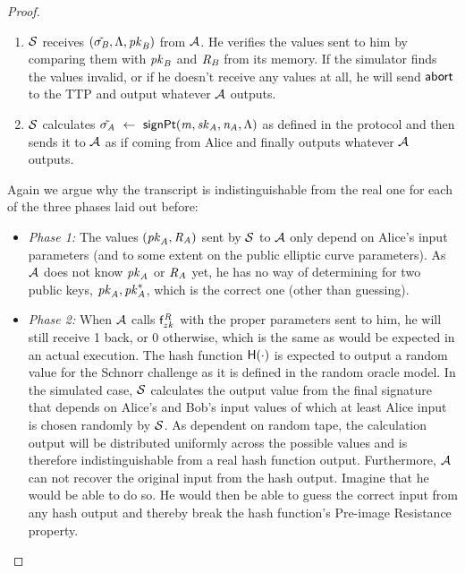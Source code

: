 \begin{proof}
\begin{enumerate}
        \item $\mathcal{S}$ receives $(\tilde{\sigma_{\mathit{B}}}, \Lambda, \mathit{pk}_{\mathit{B}})$ from $\mathcal{A}$.
        He verifies the values sent to him by comparing them with $\mathit{pk}_{\mathit{B}}$ and $\mathit{R}_{\mathit{B}}$ from its memory.
        If the simulator finds the values invalid, or if he doesn't receive any values at all, he will send $\mathsf{abort}$ to the TTP and output whatever $\mathcal{A}$ outputs.
        \item $\mathcal{S}$ calculates $\tilde{\sigma_{\mathit{A}}} ~\leftarrow~ \mathsf{signPt}(\mathit{m}, \mathit{sk}_{\mathit{A}}, \mathit{\mathit{n}_{\mathit{A}}}, \Lambda)$ as defined in the protocol and then sends it to $\mathcal{A}$ as if coming from Alice and finally outputs whatever $\mathcal{A}$ outputs.
    \end{enumerate}
    Again we argue why the transcript is indistinguishable from the real one for each of the three phases laid out before:
    \begin{itemize}
        \item \textit{Phase 1: } The values $(\mathit{pk}_{\mathit{A}}, \mathit{R}_{\mathit{A}})$ sent by $\mathcal{S}$ to $\mathcal{A}$ only depend on Alice's input parameters (and to some extent on the public elliptic curve parameters).
        As $\mathcal{A}$ does not know $\mathit{pk}_{\mathit{A}}$ or $\mathit{R}_{\mathit{A}}$ yet, he has no way of determining for two public keys, $\mathit{pk}_{\mathit{A}}, \mathit{pk}_{\mathit{A}}^*$, which is the correct one (other than guessing).
        \item \textit{Phase 2: } When $\mathcal{A}$ calls $\mathsf{f}^{\mathit{R}}_{zk}$ with the proper parameters sent to him, he will still receive 1 back, or 0 otherwise, which is the same as would be expected in an actual execution.
        The hash function $\mathsf{H} (\cdot)$ is expected to output a random value for the Schnorr challenge as it is defined in the random oracle model.
        In the simulated case, $\mathcal{S}$ calculates the output value from the final signature that depends on Alice's and Bob's input values of which at least Alice input is chosen randomly by $\mathcal{S}$.
        As dependent on random tape, the calculation output will be distributed uniformly across the possible values and is therefore indistinguishable from a real hash function output.
        Furthermore, $\mathcal{A}$ can not recover the original input from the hash output.
        Imagine that he would be able to do so. He would then be able to guess the correct input from any hash output and thereby break the hash function's Pre-image Resistance property.

\end{itemize}
\end{proof}
